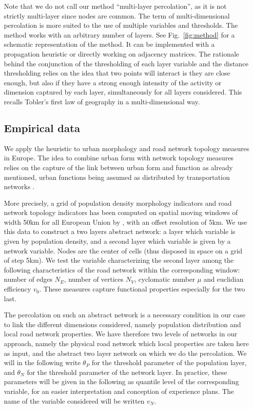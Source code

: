 \documentclass{jimis-en}
\begin{document}
Note that we do not call our method ``multi-layer percolation'', as it is not strictly multi-layer since nodes are common. The term of multi-dimensional percolation is more suited to the use of multiple variables and thresholds. The method works with an arbitrary number of layers. See Fig.~\ref{fig:method} for a schematic representation of the method. It can be implemented with a propagation heuristic or directly working on adjacency matrices. The rationale behind the conjunction of the thresholding of each layer variable and the distance thresholding relies on the idea that two points will interact is they are close enough, but also if they have a strong enough intensity of the activity or dimension captured by each layer, simultaneously for all layers considered. This recalls Tobler's first law of geography \citep{tobler2004first} in a multi-dimensional way.



\subsection{Empirical data}


We apply the heuristic to urban morphology and road network topology measures in Europe. The idea to combine urban form with network topology measures relies on the capture of the link between urban form and function as already mentioned, urban functions being assumed as distributed by transportation networks \citep{raimbault2018caracterisation}.

More precisely, a grid of population density morphology indicators and road network topology indicators has been computed on spatial moving windows of width 50km for all European Union by \cite{raimbault2018urban}, with an offset resolution of 5km. We use this data to construct a two layers abstract network: a layer which variable is given by population density, and a second layer which variable is given by a network variable. Nodes are the center of cells (thus disposed in space on a grid of step 5km). We test the variable characterizing the second layer among the following characteristics of the road network within the corresponding window: number of edges $N_E$, number of vertices $N_V$, cyclomatic number $\mu$ and euclidian efficiency $v_0$. These measures capture functional properties especially for the two last.

The percolation on such an abstract network is a necessary condition in our case to link the different dimensions considered, namely population distribution and local road network properties. We have therefore two levels of networks in our approach, namely the physical road network which local properties are taken here as input, and the abstract two layer network on which we do the percolation. We will in the following write $\theta_P$ for the threshold parameter of the population layer, and $\theta_N$ for the threshold parameter of the network layer. In practice, these parameters will be given in the following as quantile level of the corresponding variable, for an easier interpretation and conception of experience plans. The name of the variable considered will be written $v_N$.
\end{document}
